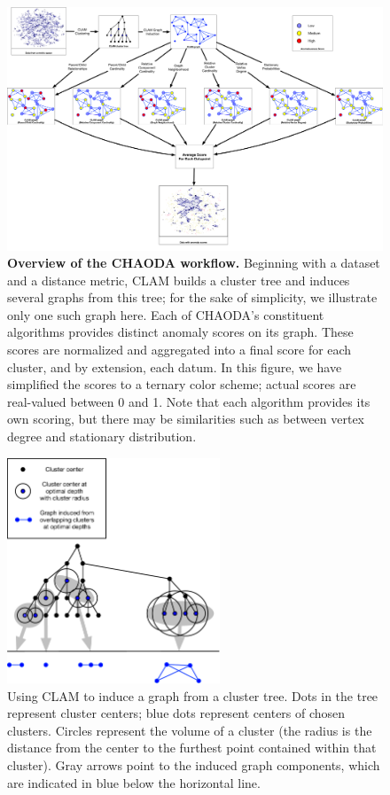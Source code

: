 \begin{figure}[ht!]
    \centering
    \includegraphics[width=6in]{images/chaoda-workflow.pdf}
    \caption{\textbf{Overview of the CHAODA workflow.}
        Beginning with a dataset and a distance metric, CLAM builds a cluster tree and induces several graphs from this tree; for the sake of simplicity, we illustrate only one such graph here.
        Each of CHAODA's constituent algorithms provides distinct anomaly scores on its graph.
        These scores are normalized and aggregated into a final score for each cluster, and by extension, each datum.
        In this figure, we have simplified the scores to a ternary color scheme; actual scores are real-valued between 0 and 1.
        Note that each algorithm provides its own scoring, but there may be similarities such as between vertex degree and stationary distribution.}
    \label{fig:methods:chaoda-workflow}
\end{figure}

\begin{figure}[ht!]
    \centering
    \includegraphics[width=2.5in]{images/tree-graph.pdf}
    \caption{Using CLAM to induce a graph from a cluster tree.
        Dots in the tree represent cluster centers;
        blue dots represent centers of chosen clusters.
        Circles represent the volume of a cluster (the radius is the distance from the center to the furthest point contained within that cluster).
        Gray arrows point to the induced graph components, which are indicated in blue below the horizontal line.}
    \label{fig:methods:graph-generation}
\end{figure}


